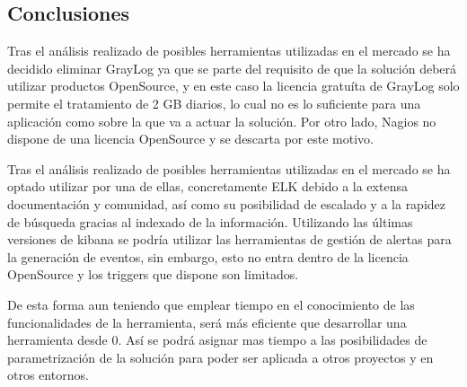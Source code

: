 \subsection{Conclusiones}

Tras el análisis realizado de posibles herramientas utilizadas en el mercado se ha decidido eliminar GrayLog ya que se parte del requisito de que la solución deberá utilizar productos OpenSource, y en este caso la licencia gratuíta de GrayLog solo permite el tratamiento de 2 GB diarios, lo cual no es lo suficiente para una aplicación como sobre la que va a actuar la solución. Por otro lado, Nagios no dispone de una licencia OpenSource y se descarta por este motivo.

Tras el análisis realizado de posibles herramientas utilizadas en el mercado se ha optado utilizar por una de ellas, concretamente ELK debido a la extensa documentación y comunidad, así como su posibilidad de escalado y a la rapidez de búsqueda gracias al indexado de la información. Utilizando las últimas versiones de kibana se podría utilizar las herramientas de gestión de alertas para la generación de eventos, sin embargo, esto no entra dentro de la licencia OpenSource y los triggers que dispone son limitados.

De esta forma aun teniendo que emplear tiempo en el conocimiento de las funcionalidades de la herramienta, será más eficiente que desarrollar una herramienta desde 0. Así se podrá asignar mas tiempo a las posibilidades de parametrización de la solución para poder ser aplicada a otros proyectos y en otros entornos.



